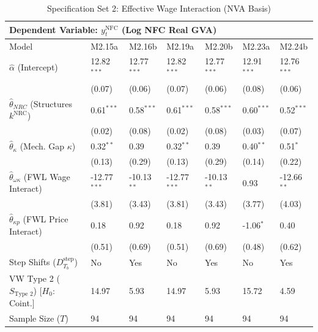 \begin{table}[H]
\centering
\setlength{\tabcolsep}{2.5pt}
\caption{Specification Set 2: Effective Wage Interaction (NVA Basis)}
\label{tab:specB_set2_nva_core}
\scriptsize
\begin{tabular}{p{3.8cm}p{1.1cm}p{1.1cm}p{1.1cm}p{1.1cm}p{1.1cm}p{1.1cm}}
\toprule
\multicolumn{7}{l}{\textbf{Dependent Variable: $y_t^{\text{NFC}}$ (Log NFC Real GVA)}} \\
\midrule
Model & M2.15a & M2.16b & M2.19a & M2.20b & M2.23a & M2.24b \\
\midrule
$\hat{\alpha}$ (Intercept) & 12.82$^{***}$ & 12.77$^{***}$ & 12.82$^{***}$ & 12.77$^{***}$ & 12.91$^{***}$ & 12.76$^{***}$ \\
 & (0.07) & (0.06) & (0.07) & (0.06) & (0.08) & (0.06) \\
$\hat{\theta}_{NRC}$ (Structures $k^{\text{NRC}}$) & 0.61$^{***}$ & 0.58$^{***}$ & 0.61$^{***}$ & 0.58$^{***}$ & 0.60$^{***}$ & 0.52$^{***}$ \\
 & (0.02) & (0.08) & (0.02) & (0.08) & (0.03) & (0.07) \\
$\hat{\theta}_{\kappa}$ (Mech. Gap $\kappa$) & 0.32$^{**}$ & 0.39 & 0.32$^{**}$ & 0.39 & 0.40$^{**}$ & 0.51$^{*}$ \\
 & (0.13) & (0.29) & (0.13) & (0.29) & (0.14) & (0.22) \\
$\hat{\theta}_{\omega\kappa}$ (FWL Wage Interact) & -12.77$^{***}$ & -10.13$^{**}$ & -12.77$^{***}$ & -10.13$^{**}$ & 0.93 & -12.66$^{**}$ \\
 & (3.81) & (3.43) & (3.81) & (3.43) & (3.77) & (4.03) \\
$\hat{\theta}_{\kappa p}$ (FWL Price Interact) & 0.18 & 0.92 & 0.18 & 0.92 & -1.06$^{*}$ & 0.40 \\
 & (0.51) & (0.69) & (0.51) & (0.69) & (0.48) & (0.62) \\
Step Shifts ($D_{T_b}^{\text{step}}$) & No & Yes & No & Yes & No & Yes \\
\midrule
VW Type 2 ($S_{\text{Type 2}}$) [$H_0$: Coint.] & 14.97 & 5.93 & 14.97 & 5.93 & 15.72 & 4.59 \\
\midrule
Sample Size ($T$) & 94 & 94 & 94 & 94 & 94 & 94 \\
\bottomrule

\end{tabular}
\end{table}
